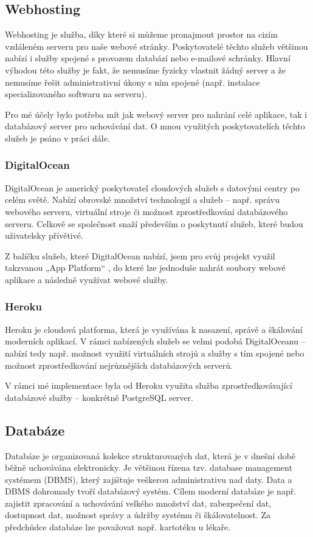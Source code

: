 	\subsection{Webhosting}
	Webhosting je služba, díky které si můžeme pronajmout prostor na cizím vzdáleném serveru pro naše webové stránky. Poskytovatelé těchto služeb většinou nabízí i služby spojené s provozem databází nebo e-mailové schránky. Hlavní výhodou této služby je fakt, že nemusíme fyzicky vlastnit žádný server a že nemusíme řešit administrativní úkony s ním spojené (např. instalace specializovaného softwaru na serveru). \cite{Webhosting}
	
	Pro mé účely bylo potřeba mít jak webový server pro nahrání celé aplikace, tak i databázový server pro uchovávání dat. O mnou využitých poskytovatelích těchto služeb je psáno v práci dále. 
	
		\subsubsection{DigitalOcean}
		DigitalOcean je americký poskytovatel cloudových služeb s datovými centry po celém světě. Nabízí obrovské množství technologií a služeb – např. správu webového serveru, virtuální stroje či možnost zprostředkování databázového serveru. Celkově se společnost snaží především o poskytnutí služeb, které budou uživatelsky přívětivé. \cite{DO1} \cite{DO2}
		
		Z balíčku služeb, které DigitalOcean nabízí, jsem pro svůj projekt využil takzvanou „App Platform“ \cite{DO3}, do které lze jednoduše nahrát soubory webové aplikace a následně využívat webové služby.
		
		\subsubsection{Heroku}
		Heroku je cloudová platforma, která je využívána k nasazení, správě a škálování moderních aplikací. V rámci nabízených služeb se velmi podobá DigitalOceanu – nabízí tedy např. možnost využití virtuálních strojů a služby s tím spojené nebo možnost zprostředkování nejrůznějších databázových serverů. \cite{Heroku1} \cite{Heroku2}
		
		V rámci mé implementace byla od Heroku využita služba zprostředkovávající databázové služby – konkrétně PostgreSQL server. 
		
	\subsection{Databáze}
	Databáze je organizovaná kolekce strukturovaných dat, která je v dnešní době běžně uchovávána elektronicky. Je většinou řízena tzv. database management systémem (DBMS), který zajištuje veškerou administrativu nad daty. Data a DBMS dohromady tvoří databázový systém. Cílem moderní databáze je např. zajistit zpracování a uchovávání velkého množství dat, zabezpečení dat, dostupnost dat, možnost správy a údržby systému či škálovatelnost. Za předchůdce databáze lze považovat např. kartotéku u lékaře. \cite{DBSummary}
	
